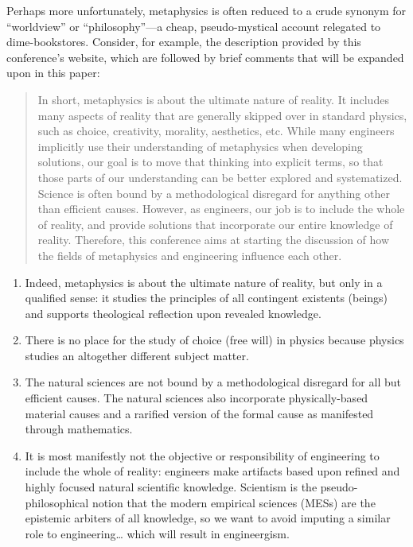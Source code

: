 Perhaps more unfortunately, metaphysics is often reduced to a crude synonym for “worldview” or “philosophy”—a cheap, pseudo-mystical account relegated to dime-bookstores. Consider, for example, the description provided by this conference’s website, which are followed by brief comments that will be expanded upon in this paper:

\begin{quote}
In short, metaphysics is about the ultimate nature of reality. It includes many aspects of reality that are generally skipped over in standard physics, such as choice, creativity, morality, aesthetics, etc. While many engineers implicitly use their understanding of metaphysics when developing solutions, our goal is to move that thinking into explicit terms, so that those parts of our understanding can be better explored and systematized. Science is often bound by a methodological disregard for anything other than efficient causes. However, as engineers, our job is to include the whole of reality, and provide solutions that incorporate our entire knowledge of reality. Therefore, this conference aims at starting the discussion of how the fields of metaphysics and engineering influence each other.\cite{aboutconference}
\end{quote}

\begin{enumerate}
\item Indeed, metaphysics is about the ultimate nature of reality, but only in a qualified sense: it studies the principles of all contingent existents (beings) and supports theological reflection upon revealed knowledge.
\item There is no place for the study of choice (free will) in physics because physics studies an altogether different subject matter.
\item The natural sciences are not bound by a methodological disregard for all but efficient causes. The natural sciences also incorporate physically-based material causes and a rarified version of the formal cause as manifested through mathematics.
\item It is most manifestly not the objective or responsibility of engineering to include the whole of reality: engineers make artifacts based upon refined and highly focused natural scientific knowledge. Scientism is the pseudo-philosophical notion that the modern empirical sciences (MESs) are the epistemic arbiters of all knowledge, so we want to avoid imputing a similar role to engineering… which will result in engineergism.
\end{enumerate}

